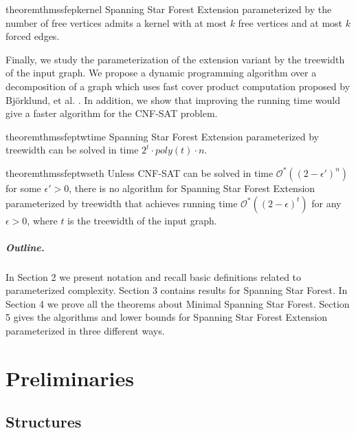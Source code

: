 \documentclass[en]{pracamgr}
\theoremstyle{definition}
\newcommand{\ssfp}{{\sc Spanning Star Forest}}
\newcommand{\mssfp}{{\sc Minimal Spanning Star Forest}}
\newcommand{\ssfep}{{\sc Spanning Star Forest Extension}}
\newcommand{\cnfsat}{{\sc CNF-SAT}}
\begin{document}
\begin{restatable}{theorem}{thmssfepkernel}\label{thm-ssfep-kernel}
	\ssfep{} parameterized by the number of free vertices admits a kernel with at most $k$ free vertices and at most $k$ forced edges.
\end{restatable}

Finally, we study the parameterization of the extension variant by the treewidth of the input graph. We propose a dynamic programming algorithm over a decomposition of a graph which uses fast cover product computation proposed by Björklund, et al. \cite{CoverProduct}. In addition, we show that improving the running time would give a faster algorithm for the \cnfsat{} problem.

\begin{restatable}{theorem}{thmssfeptwtime}\label{thm-ssfep-tw-time}
	\ssfep{} parameterized by treewidth can be solved in time $2^t\cdot poly(t)\cdot n$.
\end{restatable}

\begin{restatable}{theorem}{thmssfeptwseth}\label{thm-ssfep-tw-seth}
	Unless \cnfsat{} can be solved in time $\mathcal{O}^*((2-\epsilon')^n)$ for some $\epsilon' > 0$, there is no algorithm for \ssfep{} parameterized by treewidth that achieves running time $\mathcal{O}^*((2-\epsilon)^{t})$ for any $\epsilon > 0$, where $t$ is the treewidth of the input graph.
\end{restatable}

\paragraph{Outline.} In Section 2 we present notation and recall basic definitions related to parameterized complexity. Section 3 contains results for \ssfp{}. In Section 4 we prove all the theorems about \mssfp{}. Section 5 gives the algorithms and lower bounds for \ssfep{} parameterized in three different ways.

\chapter{Preliminaries}\label{sec2}

\section{Structures}
\end{document}
